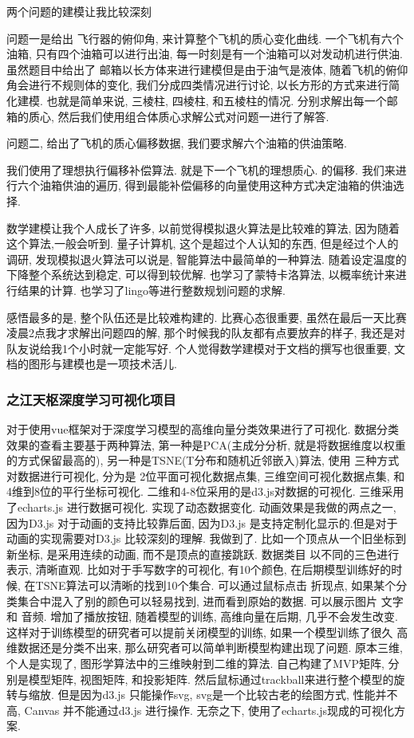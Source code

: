 \documentclass[UTF8]{ctexart}
\begin{document}
两个问题的建模让我比较深刻\par
问题一是给出 飞行器的俯仰角, 来计算整个飞机的质心变化曲线. 一个飞机有六个油箱, 只有四个油箱可以进行出油, 每一时刻是有一个油箱可以对发动机进行供油. 虽然题目中给出了 邮箱以长方体来进行建模但是由于油气是液体, 随着飞机的俯仰角会进行不规则体的变化, 我们分成四类情况进行讨论, 以长方形的方式来进行简化建模.  也就是简单来说, 三棱柱, 四棱柱, 和五棱柱的情况.  分别求解出每一个邮箱的质心, 然后我们使用组合体质心求解公式对问题一进行了解答. \par
问题二, 给出了飞机的质心偏移数据, 我们要求解六个油箱的供油策略. \par
我们使用了理想执行偏移补偿算法. 就是下一个飞机的理想质心. 的偏移. 我们来进行六个油箱供油的遍历, 得到最能补偿偏移的向量使用这种方式决定油箱的供油选择. \par
数学建模让我个人成长了许多, 以前觉得模拟退火算法是比较难的算法, 因为随着这个算法,一般会听到. 量子计算机, 这个是超过个人认知的东西, 但是经过个人的调研, 发现模拟退火算法可以说是, 智能算法中最简单的一种算法. 随着设定温度的下降整个系统达到稳定, 可以得到较优解. 也学习了蒙特卡洛算法, 以概率统计来进行结果的计算. 也学习了lingo等进行整数规划问题的求解.\par
感悟最多的是, 整个队伍还是比较难构建的. 比赛心态很重要, 虽然在最后一天比赛凌晨2点我才求解出问题四的解, 那个时候我的队友都有点要放弃的样子, 我还是对队友说给我1个小时就一定能写好. 个人觉得数学建模对于文档的撰写也很重要, 文档的图形与建模也是一项技术活儿.\par
\subsubsection{之江天枢深度学习可视化项目}
对于使用vue框架对于深度学习模型的高维向量分类效果进行了可视化. 数据分类效果的查看主要基于两种算法, 第一种是PCA(主成分分析, 就是将数据维度以权重的方式保留最高的), 另一种是TSNE(T分布和随机近邻嵌入)算法,  使用 三种方式对数据进行可视化, 分为是 2位平面可视化数据点集, 三维空间可视化数据点集, 和 4维到8位的平行坐标可视化. 二维和4-8位采用的是d3.js对数据的可视化. 三维采用了echarts.js 进行数据可视化. 实现了动态数据变化. 动画效果是我做的两点之一, 因为D3.js 对于动画的支持比较靠后面, 因为D3.js 是支持定制化显示的.但是对于动画的实现需要对D3.js 比较深刻的理解. 我做到了. 比如一个顶点从一个旧坐标到新坐标, 是采用连续的动画, 而不是顶点的直接跳跃. 数据类目 以不同的三色进行表示, 清晰直观. 比如对于手写数字的可视化, 有10个颜色, 在后期模型训练好的时候, 在TSNE算法可以清晰的找到10个集合. 可以通过鼠标点击 折现点, 如果某个分类集合中混入了别的颜色可以轻易找到, 进而看到原始的数据. 可以展示图片 文字 和 音频.  增加了播放按钮, 随着模型的训练, 高维向量在后期, 几乎不会发生改变. 这样对于训练模型的研究者可以提前关闭模型的训练, 如果一个模型训练了很久 高维数据还是分类不出来, 那么研究者可以简单判断模型构建出现了问题. 
原本三维,个人是实现了, 图形学算法中的三维映射到二维的算法. 自己构建了MVP矩阵, 分别是模型矩阵, 视图矩阵, 和投影矩阵. 然后鼠标通过trackball来进行整个模型的旋转与缩放. 但是因为d3.js 只能操作svg, svg是一个比较古老的绘图方式, 性能并不高, Canvas 并不能通过d3.js 进行操作. 无奈之下, 使用了echarts.js现成的可视化方案. 
\end{document}
